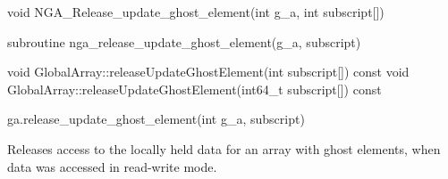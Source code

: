 \documentclass[12pt]{article}
\begin{document}
\begin{capi}
\begin{ccode}
void NGA_Release_update_ghost_element(int g_a, int subscript[])
\end{ccode}
\begin{funcargs}
\end{funcargs}
\end{capi}

\begin{fapi}
\begin{fcode}
subroutine nga_release_update_ghost_element(g_a, subscript)
\end{fcode}
\begin{funcargs}
\end{funcargs}
\end{fapi}

\begin{cxxapi}
\begin{cxxcode}
void GlobalArray::releaseUpdateGhostElement(int subscript[]) const
void GlobalArray::releaseUpdateGhostElement(int64_t subscript[]) const
\end{cxxcode}
\begin{funcargs}
\end{funcargs}
\end{cxxapi}

\begin{pyapi}
\begin{pycode}
ga.release_update_ghost_element(int g_a, subscript)
\end{pycode}
\begin{funcargs}
\end{funcargs}
\end{pyapi}

\local

\begin{desc}

Releases access to the locally held data for an array with ghost elements, when
data was accessed in read-write mode.

\end{desc}


\end{document}
